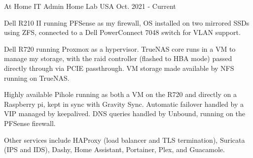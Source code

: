 \begin{cventries}
  \cventry
    {At Home IT Admin} %
    {Home Lab} %
    {USA} %
    {Oct. 2021 - Current} %
    {
      \begin{cvitems} %
        \item {Dell R210 II running PFSense as my firewall, OS installed on two mirrored SSDs using ZFS, connected to a Dell PowerConnect 7048 switch for VLAN support.}
        \item {Dell R720 running Proxmox as a hypervisor. TrueNAS core runs in a VM to manage my storage, with the raid controller (flashed to HBA mode) passed directly through via PCIE passthrough. VM storage made available by NFS running on TrueNAS.}
        \item {Highly available Pihole running as both a VM on the R720 and directly on a Raspberry pi, kept in sync with Gravity Sync. Automatic failover handled by a VIP managed by keepalived. DNS queries handled by Unbound, running on the PFSense firewall.}
        \item {Other services include HAProxy (load balancer and TLS termination), Suricata (IPS and IDS), Dashy, Home Assistant, Portainer, Plex, and Guacamole.}
      \end{cvitems}
    }

\end{cventries}

